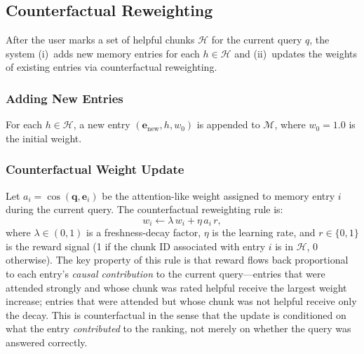 \documentclass[journal]{IEEEtran}
\begin{document}
\subsection{Counterfactual Reweighting}
\label{sec:cfr}
After the user marks a set of helpful chunks $\mathcal{H}$ for the current
query $q$, the system (i)~adds new memory entries for each
$h\in\mathcal{H}$ and (ii)~updates the weights of existing entries via
counterfactual reweighting.

\subsubsection{Adding New Entries}
For each $h\in\mathcal{H}$, a new entry
$(\mathbf{e}_{\text{new}}, h, w_0)$ is appended to $\mathcal{M}$, where
$w_0 = 1.0$ is the initial weight.

\subsubsection{Counterfactual Weight Update}
Let $a_i = \cos(\mathbf{q}, \mathbf{e}_i)$ be the attention-like weight
assigned to memory entry $i$ during the current query.  The counterfactual
reweighting rule is:
\begin{equation}
w_i \leftarrow \lambda\,w_i + \eta\,a_i\,r,
\label{eq:update}
\end{equation}
where $\lambda \in (0,1)$ is a freshness-decay factor, $\eta$ is the
learning rate, and $r\in\{0,1\}$ is the reward signal (1 if the chunk ID
associated with entry $i$ is in $\mathcal{H}$, 0 otherwise).  The key
property of this rule is that reward flows back proportional to each
entry's \emph{causal contribution} to the current query---entries that
were attended strongly and whose chunk was rated helpful receive the
largest weight increase; entries that were attended but whose chunk was
not helpful receive only the decay.  This is counterfactual in the sense
that the update is conditioned on what the entry \emph{contributed} to
the ranking, not merely on whether the query was answered correctly.
\end{document}
